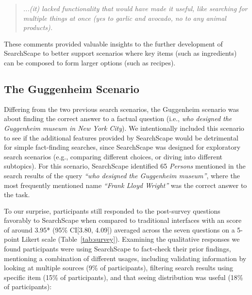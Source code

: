 \blockquote{\emph{...(it) lacked functionality that would have made it useful, like searching for multiple things at once (yes to garlic and avocado, no to any animal products).}}


These comments provided valuable insights to the further development of SearchScape to better support scenarios where key items (such as ingredients) can be composed to form larger options (such as recipes).


\subsection{The Guggenheim Scenario}

Differing from the two previous search scenarios, the Guggenheim scenario was about finding the correct answer to a factual question (i.e., \emph{who designed the Guggenheim museum in New York City}). We intentionally included this scenario to see if the additional features provided by SearchScape would be detrimental for simple fact-finding searches, since SearchScape was designed for exploratory search scenarios (e.g., comparing different choices, or diving into different subtopics). 
For this scenario, SearchScape identified 65 \emph{Persons} mentioned in the search results of the query \emph{``who designed the Guggenheim museum''}, where the most frequently mentioned name \emph{``Frank Lloyd Wright''} was the correct answer to the task.

To our surprise, participants still responded to the post-survey questions favorably to SearchScape when compared to traditional interfaces with an score of around 3.95* (95\% CI[3.80, 4.09]) averaged across the seven questions on a 5-point Likert scale (Table~\ref{tab:survey}). Examining the qualitative responses we found participants were using SearchScape to fact-check their prior findings, mentioning a combination of different usages, including validating information by looking at multiple sources (9\% of participants), filtering search results using specific item (15\% of participants), and that seeing distribution was useful (18\% of participants): 

